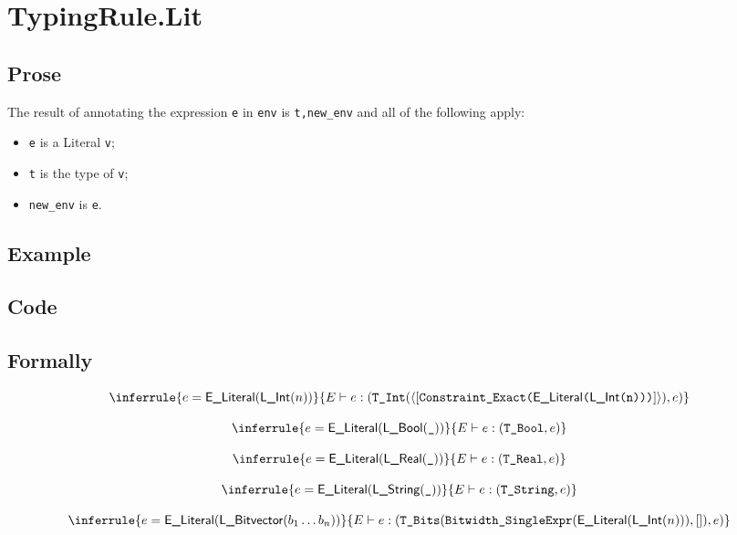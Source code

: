 \documentclass{book}
\newcommand\Ignore[0]{\texttt{\_}}
\newcommand\eliteral[1]{\textsf{E\_Literal}(#1)}
\begin{document}
\section{TypingRule.Lit \label{sec:TypingRule.Lit}}

  \subsection{Prose}
  The result of annotating the expression \texttt{e} in \texttt{env} is
\texttt{t,new\_env} and all of the following apply:
  \begin{itemize}
  \item \texttt{e} is a Literal \texttt{v};
  \item \texttt{t} is the type of \texttt{v};
  \item \texttt{new\_env} is \texttt{e}.
  \end{itemize}

  \subsection{Example}

  \subsection{Code}

\begin{emptyformal}
  \subsection{Formally}
  
\[
\begin{array}{c}
\inferrule{e = \eliteral{\lint(n)}}{E \entails e : (\TInt(\langle[\texttt{Constraint\_Exact(\eliteral{\lint(n)})}]\rangle), e)}\\
\\
\inferrule{e = \eliteral{\lbool(\Ignore)}}{E \entails e : (\TBool, e)}\\
\\
\inferrule{e = \eliteral{\lreal(\Ignore)}}{E \entails e : (\TReal, e)}\\
\\
\inferrule{e = \eliteral{\lstring(\Ignore)}}{E \entails e : (\TString, e)}\\
\\
\inferrule{e = \eliteral{\lbitvector(b_1 \ldots b_n)}}
{E \entails e : (\TBits(\texttt{Bitwidth\_SingleExpr}(\eliteral{\lint(n)}), []), e)}\\
\end{array}
\]
\end{emptyformal}
\end{document}
